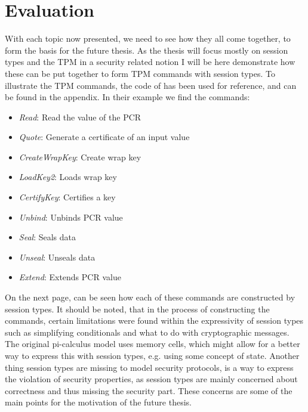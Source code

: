 \newpage
\iffalse
For the evaluation section I would start by saying what you have been forced to do:
Remove all cryptographic messages and simplify stuff, like equality checks. Also the original pi-calculus model uses memory cells, and maybe there?s a better way to express this with a session type, for example using some concept of state.
Another thing that?s missing on the session type is a way to express the violation of a security property (session types are mainly concerned about correctness, but here we want to use them for security, so that?s something missing).
 \fi
\section{Evaluation}
With each topic now presented, we need to see how they all come together, to form the basis for the future thesis. As the thesis will focus mostly on session types and the TPM in a security related notion I will be here demonstrate how these can be put together to form TPM commands with session types. To illustrate the TPM commands, the code of \citeauthor{DBLP:conf/csfw/DelauneKRS11} has been used for reference, and can be found in the appendix. In their example we find the commands:
\begin{spacing}{1}
\begin{itemize}
	\item \textit{Read}: Read the value of the PCR
	\item \textit{Quote}: Generate a certificate of an input value
	\item \textit{CreateWrapKey}: Create wrap key
	\item \textit{LoadKey2}: Loads wrap key
	\item \textit{CertifyKey}: Certifies a key
	\item \textit{Unbind}: Unbinds PCR value
	\item \textit{Seal}: Seals data
	\item \textit{Unseal}: Unseals data
	\item \textit{Extend}: Extends PCR value
\end{itemize}
\end{spacing}
\noindent On the next page, can be seen how each of these commands are constructed by session types. It should be noted, that in the process of constructing the commands, certain limitations were found within the expressivity of session types such as simplifying conditionals and what to do with cryptographic messages. The original pi-calculus model uses memory cells, which might allow for a better way to express this with session types, e.g. using some concept of state. Another thing session types are missing to model security protocols, is a way to express the violation of security properties, as session types are mainly concerned about correctness and thus missing the security part. These concerns are some of the main points for the motivation of the future thesis. 

